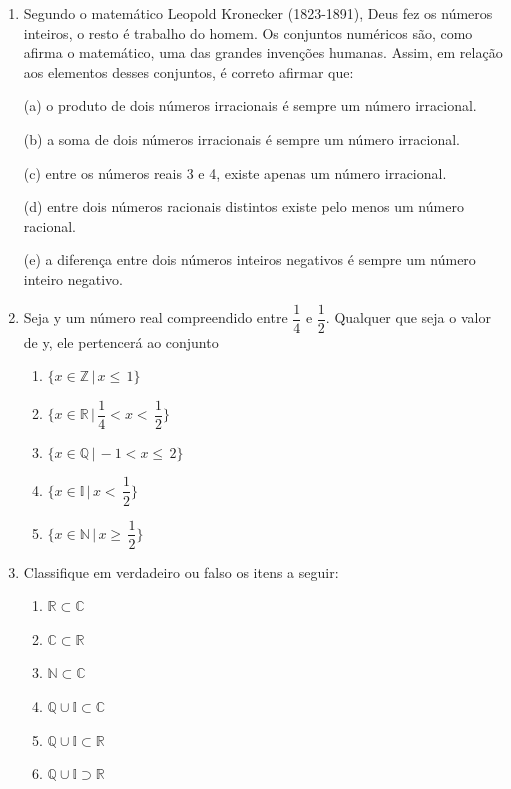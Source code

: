 \documentclass[a4paper, 11pt]{article}
\begin{document}
\begin{enumerate}

\item  Segundo o matemático Leopold Kronecker (1823-1891), Deus fez os números inteiros, o resto é trabalho do homem. Os conjuntos numéricos são, como afirma o matemático, uma das grandes invenções humanas. Assim, em relação aos elementos desses conjuntos, é correto afirmar que:

(a) o produto de dois números irracionais é sempre um número irracional.

(b) a soma de dois números irracionais é sempre um número irracional.

(c) entre os números reais 3 e 4, existe apenas um número irracional.

(d) entre dois números racionais distintos existe pelo menos um número racional.

(e) a diferença entre dois números inteiros negativos é sempre um número inteiro negativo.


\item Seja y um número real compreendido entre $\dfrac{1}{4}$ e $\dfrac{1}{2}$. Qualquer que seja o valor de y, ele pertencerá ao conjunto
	\begin{enumerate}
	\item $ \{ x \in \mathbb{Z} \, | \, x \leq \,1 \} $
	\item $ \{ x \in \mathbb{R} \, | \, \dfrac{1}{4} < x < \, \dfrac{1}{2} \} $
	\item $ \{ x \in \mathbb{Q} \, | \, -1 < x \leq \, 2 \} $
	\item $ \{ x \in \mathbb{I} \, | \, x < \, \dfrac{1}{2} \} $
	\item $ \{ x \in \mathbb{N} \, | \, x \geq  \, \dfrac{1}{2} \} $
	\end{enumerate}


\item Classifique em verdadeiro ou falso os itens a seguir:
	\begin{enumerate}
	\item $\mathbb{R} \subset \mathbb{C}$
	\item $\mathbb{C} \subset \mathbb{R}$
	\item $\mathbb{N} \subset \mathbb{C}$
	\item $\mathbb{Q} \cup \mathbb{I} \subset \mathbb{C}$
	\item $\mathbb{Q} \cup \mathbb{I} \subset \mathbb{R}$
	\item $\mathbb{Q} \cup \mathbb{I} \supset \mathbb{R}$	
	\end{enumerate}


\end{enumerate}
\end{document}
